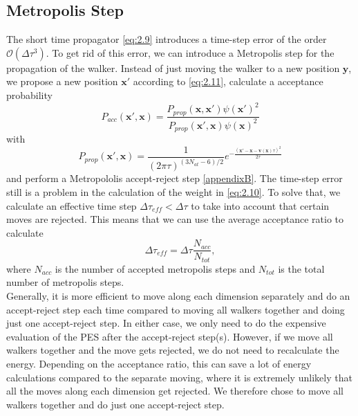 \documentclass [12pt]{report}
\begin{document}
\subsection{Metropolis Step} \label{metro}
The short time propagator \eqref{eq:2.9} introduces a time-step error of the order $\mathcal{O}(\Delta \tau^3)$. To get rid of this error, we can introduce a Metropolis step for the propagation of the walker. Instead of just moving the walker to a new position $\bm{y}$, we propose a new position $\bm{x}'$ according to \eqref{eq:2.11}, calculate a acceptance probability 
\begin{equation}\label{Pacc}
P_{acc}(\bm{x}',\bm{x}) = \frac{P_{prop}(\bm{x},\bm{x}') \psi(\bm{x}')^2}{P_{prop}(\bm{x}',\bm{x}) \psi(\bm{x})^2}
\end{equation}
with
\begin{equation}\label{Pprop}
P_{prop}(\bm{x}',\bm{x}) = \frac{1}{(2\pi\tau)^{(3N_{at}-6)/2}} e^{-\frac{(\bm{x}'-\bm{x}-\bm{v}(\bm{x})\tau)^2}{2\tau}}
\end{equation}
and perform a Metropololis accept-reject step \ref{appendixB}.
The time-step error still is a problem in the calculation of the weight in \eqref{eq:2.10}. To solve that, we calculate an effective time step $\Delta \tau_{eff} < \Delta \tau$ to take into account that certain moves are rejected. This means that we can use the average acceptance ratio to calculate
\begin{equation}\label{tau_eff}
\Delta \tau_{eff} = \Delta \tau \frac{N_{acc}}{N_{tot}},
\end{equation}
where $N_{acc}$ is the number of accepted metropolis steps and $N_{tot}$ is the total number of metropolis steps.\\
Generally, it is more efficient to move along each dimension separately and do an accept-reject step each time compared to moving all walkers together and doing just one accept-reject step. In either case, we only need to do the expensive evaluation of the PES after the accept-reject step(s). However, if we move all walkers together and the move gets rejected, we do not need to recalculate the energy. Depending on the acceptance ratio, this can save a lot of energy calculations compared to the separate moving, where it is extremely unlikely that all the moves along each dimension get rejected. We therefore chose to move all walkers together and do just one accept-reject step.
\end{document}
